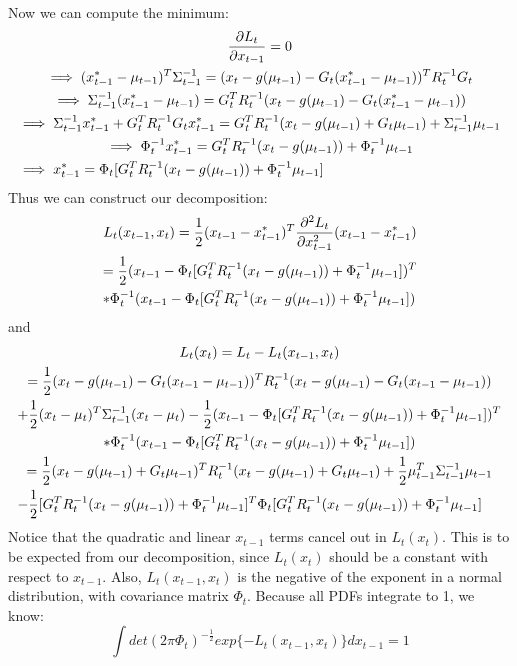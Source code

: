 Now we can compute the minimum:
\begin{multline}
\frac{\partial L_t}{\partial x_{t-1}} = 0 \\
\implies (x_{t-1}^* - \mu_{t-1})^T \Sigma_{t-1}^{-1} = (x_t - g(\mu_{t-1}) - G_t (x_{t-1}^* - \mu_{t-1}))^T R_t^{-1} G_t \\
\implies \Sigma_{t-1}^{-1} (x_{t-1}^* - \mu_{t-1}) = G_t^T R_t^{-1}  (x_t - g(\mu_{t-1}) - G_t (x_{t-1}^* - \mu_{t-1})) \\
\implies \Sigma_{t-1}^{-1} x_{t-1}^* + G_t^T R_t^{-1}G_t x_{t-1}^* = G_t^T R_t^{-1}  (x_t - g(\mu_{t-1}) + G_t \mu_{t-1}) + \Sigma_{t-1}^{-1} \mu_{t-1} \\
\implies \Phi_t^{-1} x_{t-1}^* = G_t^T R_t^{-1}  (x_t - g(\mu_{t-1})) + \Phi_t^{-1} \mu_{t-1} \\
\implies x_{t-1}^* = \Phi_t [G_t^T R_t^{-1}  (x_t - g(\mu_{t-1})) + \Phi_t^{-1} \mu_{t-1}] \hfill
\end{multline}
Thus we can construct our decomposition:
\begin{multline*}
L_t(x_{t-1},x_t) = \frac{1}{2} (x_{t-1} - x_{t-1}^*)^T \frac{\partial^2 L_t}{\partial x_{t-1}^2} (x_{t-1} - x_{t-1}^*) \\
= \frac{1}{2} (x_{t-1} - \Phi_t [G_t^T R_t^{-1}  (x_t - g(\mu_{t-1})) + \Phi_t^{-1} \mu_{t-1}])^T \\
* \Phi_t^{-1} (x_{t-1} - \Phi_t [G_t^T R_t^{-1}  (x_t - g(\mu_{t-1})) + \Phi_t^{-1} \mu_{t-1}]) \hfill
\end{multline*}
and
\begin{multline} \label{eqDefLtxt}
L_t(x_t) = L_t -  L_t(x_{t-1},x_t) \\
= \frac{1}{2} (x_t - g(\mu_{t-1}) - G_t (x_{t-1} - \mu_{t-1}))^T R_t^{-1} (x_t - g(\mu_{t-1}) - G_t (x_{t-1} - \mu_{t-1}))\\
+ \frac{1}{2} (x_t - \mu_t)^T \Sigma_{t-1}^{-1} (x_t - \mu_t) - \frac{1}{2} (x_{t-1} - \Phi_t [G_t^T R_t^{-1}  (x_t - g(\mu_{t-1})) + \Phi_t^{-1} \mu_{t-1}])^T \\
* \Phi_t^{-1} (x_{t-1} - \Phi_t [G_t^T R_t^{-1}  (x_t - g(\mu_{t-1})) + \Phi_t^{-1} \mu_{t-1}]) \\
= \frac{1}{2} (x_t - g(\mu_{t-1}) + G_t \mu_{t-1})^T R_t^{-1} (x_t - g(\mu_{t-1}) + G_t \mu_{t-1}) + \frac{1}{2} \mu_{t-1}^T \Sigma_{t-1}^{-1} \mu_{t-1} \\
- \frac{1}{2} [G_t^T R_t^{-1}  (x_t - g(\mu_{t-1})) + \Phi_t^{-1} \mu_{t-1}]^T \Phi_t [G_t^T R_t^{-1}  (x_t - g(\mu_{t-1})) + \Phi_t^{-1} \mu_{t-1}] \hfill
\end{multline}
Notice that the quadratic and linear \(x_{t-1}\) terms cancel out in \(L_t(x_t)\). This is to be expected from our decomposition, since \(L_t(x_t)\) should be a constant with respect to \(x_{t-1}\). Also, \(L_t(x_{t-1},x_t)\) is the negative of the exponent in a normal distribution, with covariance matrix \(\Phi_t\). Because all PDFs integrate to 1, we know:
\begin{equation} \label{eqLtInt1}
\int det(2 \pi \Phi_t)^{-\frac{1}{2}} exp\{-L_t(x_{t-1},x_t)\}dx_{t-1} = 1
\end{equation}

